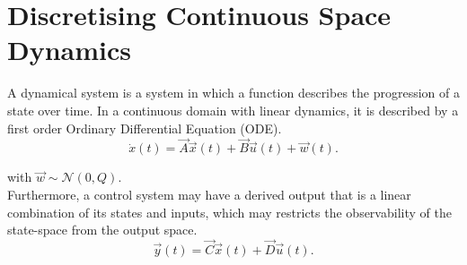 \documentclass[runningheads,a4paper]{llncs}
\begin{document}

\section{Discretising Continuous Space Dynamics}

A dynamical system is a system in which a function describes the progression of a state over time. 
In a continuous domain with linear dynamics, it is described by a first order Ordinary Differential Equation (ODE).
\begin{equation}
\dot{x}(t)=\vec{A}\vec{x}(t)+\vec{B}\vec{u}(t) +\vec{w}(t).
\label{eq:dynamical}
\end{equation}

\noindent with $\vec{w} \sim \mathcal{N}(0,Q)$.\\
Furthermore, a control system may have a derived output that is a linear combination of its states and inputs, 
which may restricts the observability of the state-space from the output space.
\begin{equation}
\vec{y}(t)=\vec{C}\vec{x}(t)+\vec{D}\vec{u}(t).
\end{equation}
\end{document}
